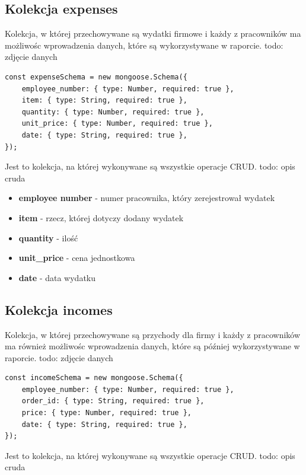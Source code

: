 \documentclass[12pt]{article}
\begin{document}
\newpage
\begin{samepage}
\subsection{Kolekcja expenses}
Kolekcja, w której przechowywane są wydatki firmowe i każdy z pracowników ma możliwośc wprowadzenia danych, które są wykorzystywane w raporcie.
todo: zdjęcie danych
\begin{lstlisting}[caption={Expenses}]
const expenseSchema = new mongoose.Schema({
	employee_number: { type: Number, required: true },
	item: { type: String, required: true },
	quantity: { type: Number, required: true },
	unit_price: { type: Number, required: true },
	date: { type: String, required: true },
});
\end{lstlisting}
Jest to kolekcja, na której wykonywane są wszystkie operacje CRUD.
todo: opis cruda
\end{samepage}

\begin{itemize}
	\item \textbf{employee number} - numer pracownika, który zerejestrował wydatek
	\item \textbf{item} - rzecz, której dotyczy dodany wydatek
	\item \textbf{quantity} - ilość 
	\item \textbf{unit\_price} - cena jednostkowa
	\item \textbf{date} - data wydatku
\end{itemize}

\newpage
\begin{samepage}
\subsection{Kolekcja incomes}
Kolekcja, w której przechowywane są przychody dla firmy i każdy z pracowników ma również możliwośc wprowadzenia danych, które są później wykorzystywane w raporcie.
todo: zdjęcie danych
\begin{lstlisting}[caption={Incomes}]
const incomeSchema = new mongoose.Schema({
    employee_number: { type: Number, required: true },
    order_id: { type: String, required: true },
    price: { type: Number, required: true },
    date: { type: String, required: true },
});
\end{lstlisting}
Jest to kolekcja, na której wykonywane są wszystkie operacje CRUD.
todo: opis cruda
\end{samepage}
\end{document}
